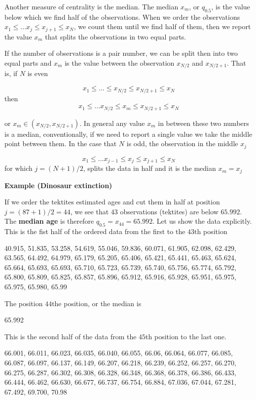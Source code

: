 \documentclass[
]{book}
\begin{document}
Another measure of centrality is the median. The median \(x_m\), or \(q_{0.5}\), is the value below which we find half of the observations. When we order the observations \(x_1 \leq ... x_j \leq x_{j+1} \leq x_N\), we count them until we find half of them, then we report the value \(x_m\) that splits the observations in two equal parts.

If the number of observations is a pair number, we can be split then into two equal parts and \(x_m\) is the value between the observation \(x_{N/2}\) and \(x_{N/2+1}\). That is, if \(N\) is even

\[x_1 \leq... \leq x_{N/2} \leq x_{N/2+1} \leq x_N\]
then
\[x_1 \leq ... x_{N/2} \leq x_m \leq x_{N/2+1} \leq x_N\]

or \(x_m \in (x_{N/2}, x_{N/2+1})\). In general any value \(x_m\) in between these two numbers is a median, conventionally, if we need to report a single value we take the middle point between them. In the case that \(N\) is odd, the observation in the middle \(x_j\)

\[x_1 \leq ... x_{j-1} \leq x_j \leq x_{j+1} \leq x_N\]
for which \(j=(N+1)/2\), splits the data in half and it is the median
\(x_m=x_j\)

\textbf{Example (Dinosaur extinction)}

If we order the tektites estimated ages and cut them in half at position \(j=(87+1)/2=44\), we see that \(43\) observations (tektites) are below \(65.992\). The \textbf{median age} is therefore \(q_{0.5}= x_{44}=65.992\). Let us show the data explicitly. This is the fist half of the ordered data from the first to the \(43\)th position

40.915, 51.835, 53.258, 54.619, 55.046, 59.836, 60.071, 61.905, 62.098, 62.429, 63.565, 64.492, 64.979, 65.179, 65.205, 65.406, 65.421, 65.441, 65.463, 65.624, 65.664, 65.693, 65.693, 65.710, 65.723, 65.739, 65.740, 65.756, 65.774, 65.792, 65.800, 65.809, 65.825, 65.857, 65.896, 65.912, 65.916, 65.928, 65.951, 65.975, 65.975, 65.980, 65.99

The position \(44\)the position, or the median is

65.992

This is the second half of the data from the \(45\)th position to the last one.

66.001, 66.011, 66.023, 66.035, 66.040, 66.055, 66.06, 66.064, 66.077, 66.085, 66.087, 66.097, 66.137, 66.149, 66.207, 66.218, 66.239, 66.252, 66.257, 66.270, 66.275, 66.287, 66.302, 66.308, 66.328, 66.348, 66.368, 66.378, 66.386, 66.433, 66.444, 66.462, 66.630, 66.677, 66.737, 66.754, 66.884, 67.036, 67.044, 67.281, 67.492, 69.700, 70.98
\end{document}
